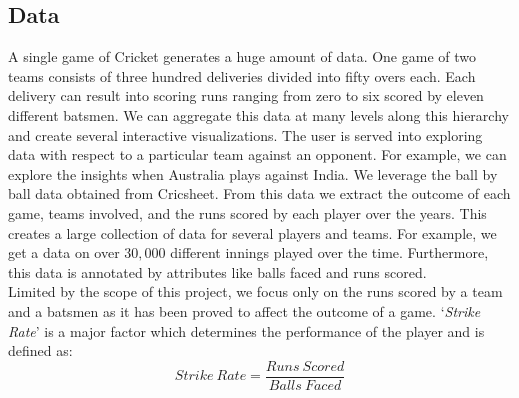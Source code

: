 \documentclass[10pt,journal,compsoc]{IEEEtran}
\begin{document}
\subsection {Data}
\indent A single game of Cricket generates a huge amount of data. One game of two teams consists of three hundred deliveries divided into fifty overs each. Each delivery can result into scoring runs ranging from zero to six scored by eleven different batsmen. We can aggregate this data at many levels along this hierarchy and create several interactive visualizations. The user is served into exploring data with respect to a particular team against an opponent. For example, we can explore the insights when Australia plays against India. We leverage the ball by ball data obtained from Cricsheet\cite{cricsheet}. From this data we extract the outcome of each game, teams involved, and the runs scored by each player over the years. This creates a large collection of data for several players and teams. For example, we get a data on over $30,000$ different innings played over the time. Furthermore, this data is annotated by attributes like balls faced and runs scored.\\

\indent Limited by the scope of this project, we focus only on the runs scored by a team and a batsmen as it has been proved to affect the outcome of a game. `\textit{Strike Rate}' is a major factor which determines the performance of the player and is defined as:
\begin{equation*}
Strike\ Rate = \frac{Runs\ Scored}{Balls\ Faced}
\end{equation*}
\end{document}
